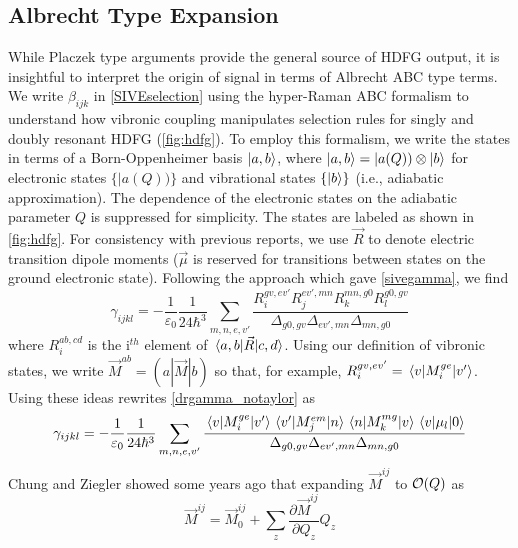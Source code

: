 \documentclass[aip, jcp, reprint, onecolumn]{revtex4-2}
\begin{document}
\subsection{Albrecht Type Expansion}
While Placzek type arguments provide the general source of HDFG output, it is insightful to interpret the origin of signal in terms of Albrecht ABC type terms.\cite{Ziegler1988} 
We write $\beta_{ijk}$ in \autoref{SIVEselection} using the hyper-Raman ABC formalism to understand how vibronic coupling manipulates selection rules for singly and doubly resonant HDFG (\autoref{fig:hdfg}). \cite{Ziegler1988, Baranov1990}
To employ this formalism, we write the states in terms of a Born-Oppenheimer basis $\ket{a,b}$, where $\ket{a,b} = |a(Q)) \otimes \ket{b}$ for electronic states $\{|a(Q))\}$ and vibrational states $\{\ket{b}\}$ (i.e., adiabatic approximation). \cite{BornOppenheimer, Tang1970}
The dependence of the electronic states on the adiabatic parameter $Q$ is suppressed for simplicity.
The states are labeled as shown in \autoref{fig:hdfg}.
For consistency with previous reports, we use $\vec{R}$ to denote electric transition dipole moments ($\vec{\mu}$ is reserved for transitions between states on the ground electronic state). \cite{Tang1970}
Following the approach which gave \autoref{sivegamma}, we find
\begin{equation}\label{drgamma_notaylor}
	\gamma_{ijkl} = -\frac{1}{\varepsilon_0} \frac{1}{24 \hbar^3} \sum_{m,n,e,v'} \frac{
		R_{i}^{gv, ev'} 
		R_{j}^{ev',mn} 
		R_{k}^{mn,g0} 
		R_{l}^{g0,gv} 
	}{\Delta_{g0,gv}
		\Delta_{ev', mn}
		\Delta_{mn, g0}
	}
\end{equation}
where $R_{i}^{ab,cd}$ is the i$^{th}$ element of $\mel{a,b}{\vec{R}}{c,d}$.
Using our definition of vibronic states, we write $\vec{M}^{ab} = (a|\vec{M}|b)$ so that, for example,
$R_{i}^{gv,ev'} = \mel{v}{M_i^{ge}}{v'}$.
Using these ideas rewrites \autoref{drgamma_notaylor} as
\begin{equation}\label{drgamma_notaylor_1}
	\begin{split}
		\gamma_{ijkl} &= -\frac{1}{\varepsilon_0} \frac{1}{24 \hbar^3} \sum_{m,n,e,v'} \frac{
			\mel{v}{M_{i}^{ge}}{v'} 
			\mel{v'}{M_{j}^{em}}{n}
			\mel{n}{M_{k}^{mg} }{v}
			\mel{v}{\mu_{l}}{0}
		}{\Delta_{g0,gv}
			\Delta_{ev', mn}
			\Delta_{mn, g0}	} \\
	\end{split}
\end{equation}
Chung and Ziegler showed some years ago that expanding $\vec{M}^{ij}$ to $\order{Q}$ as
\begin{equation}
\vec{M}^{ij} = \vec{M}^{ij}_0 + \sum_z \frac{\partial\vec{M}^{ij}}{\partial Q_z} Q_z
\end{equation} 
\end{document}
